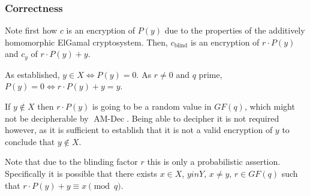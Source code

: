 \documentclass[a4paper]{scrreprt}
\begin{document}

\subsubsection{Correctness}

Note first how $c$ is an encryption of $P(y)$ due to the properties of the
additively homomorphic ElGamal cryptosystem. Then, $c_{\text{blind}}$ is an
encryption of $r \cdot P(y)$ and $c_y$ of $r \cdot P(y) + y$.

As established, $y \in X \Leftrightarrow P(y) = 0$. As $r \neq 0$ and $q$
prime, $P(y) = 0 \Leftrightarrow r \cdot P(y) + y = y$.

If $y \not \in X$ then $r \cdot P(y)$ is going to be a random value in
$GF(q)$, which might not be decipherable by $\operatorname{AM-Dec}$.
Being able to decipher it is not required however, as it is sufficient to
establish that it is not a valid encryption of $y$ to conclude that $y \not \in
X$.

Note that due to the blinding factor $r$ this is only a probabilistic
assertion. Specifically it is possible that there exists $x \in X$, $y in Y$,
$x \neq y$, $r \in GF(q)$ such that $r \cdot P(y) + y \equiv x \pmod{q}$.
\end{document}
